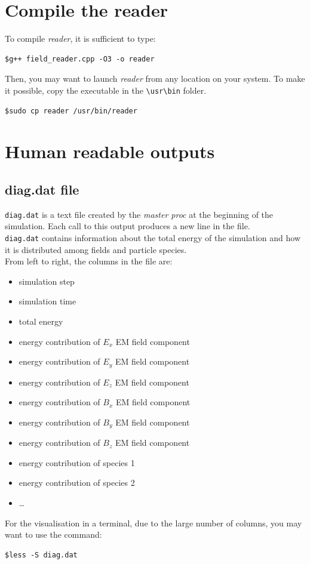 \documentclass[11pt,a4paper]{report}
\begin{document}
\section{Compile the reader}
To compile \emph{reader}, it is sufficient to type:
\begin{verbatim}
$g++ field_reader.cpp -O3 -o reader
\end{verbatim}
Then, you may want to launch \emph{reader} from any location on your system. To make it possible, copy the executable in the \verb+\usr\bin+ folder.
\begin{verbatim}
$sudo cp reader /usr/bin/reader
\end{verbatim}

\section{Human readable outputs}
\subsection{diag.dat file}
\verb+diag.dat+ is a text file created by the \emph{master proc} at the beginning of the simulation. Each call to this output produces a new line in the file.\\
\verb+diag.dat+ contains information about the total energy of the simulation and how it is distributed among fields and particle species. \\
From left to right, the columns in the file are:
\begin{itemize}
\item simulation step
\item simulation time
\item total energy
\item energy contribution of $E_x$ EM field component
\item energy contribution of $E_y$ EM field component
\item energy contribution of $E_z$ EM field component
\item energy contribution of $B_x$ EM field component
\item energy contribution of $B_y$ EM field component
\item energy contribution of $B_z$ EM field component
\item energy contribution of species 1
\item energy contribution of species 2
\item \ldots
\end{itemize}
For the visualisation in a terminal, due to the large number of columns, you may want to use the command:
\begin{verbatim}
$less -S diag.dat
\end{verbatim}
\end{document}
